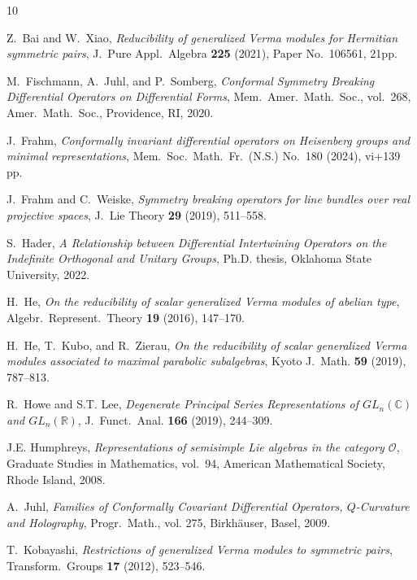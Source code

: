\documentclass[reqno,11pt]{amsart}
\theoremstyle{remark}
\theoremstyle{definition}
\numberwithin{equation}{section}
\newcommand{\R}{\mathbb{R}}
\begin{document}
\begin{thebibliography}{10}

Z.~Bai and W.~Xiao, \emph{{Reducibility of generalized Verma modules for
  Hermitian symmetric pairs}}, J.\ Pure Appl.\ Algebra \textbf{225} (2021),
  Paper No.\ 106561, 21pp.

M.~Fischmann, A.~Juhl, and P.~Somberg, \emph{{Conformal Symmetry Breaking
  Differential Operators on Differential Forms}}, Mem.\ Amer.\ Math.\ Soc.,
  vol.\ 268, Amer.\ Math.\ Soc., Providence, RI, 2020.

J.~Frahm, \emph{{Conformally invariant differential operators on Heisenberg
  groups and minimal representations}}, Mem.\ Soc.\ Math.\ Fr.\ (N.S.) No.\ 180 (2024), vi+139 pp.

J.~Frahm and C.~Weiske, \emph{{Symmetry breaking operators for line bundles
  over real projective spaces}}, J.\ Lie Theory \textbf{29} (2019), 511--558.

S.~Hader, \emph{{A Relationship between Differential Intertwining Operators on
  the Indefinite Orthogonal and Unitary Groups}}, Ph.D. thesis, Oklahoma State
  University, 2022.

H.~He, \emph{{On the reducibility of scalar generalized {V}erma modules of
  abelian type}}, Algebr.\ Represent.\ Theory \textbf{19} (2016), 147--170.

H.~He, T.~Kubo, and R.~Zierau, \emph{{On the reducibility of scalar generalized
  Verma modules associated to maximal parabolic subalgebras}}, Kyoto J.\ Math.
  \textbf{59} (2019), 787--813.

R.~Howe and S.T. Lee, \emph{{Degenerate Principal Series Representations of
  $GL_n(\mathbb{C})$ and $GL_n(\mathbb{\R})$}}, J.\ Funct.\ Anal. \textbf{166}
  (2019), 244--309.

J.E. Humphreys, \emph{Representations of semisimple \textit{L}ie algebras in
  the  category $\mathcal{O}$}, Graduate Studies in Mathematics,
  vol.~94, American Mathematical Society, Rhode Island, 2008.

A.~Juhl, \emph{{Families of Conformally Covariant Differential Operators,
  $Q$-Curvature and Holography}}, Progr.\ Math., vol. 275, Birkh\"auser, Basel,
  2009.

T.~Kobayashi, \emph{{Restrictions of generalized Verma modules to symmetric
  pairs}}, Transform.\ Groups \textbf{17} (2012), 523--546.


\end{thebibliography}
\end{document}
